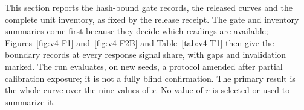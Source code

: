 
This section reports the hash-bound gate records, the released curves and the complete unit inventory, as fixed by the release receipt. The gate and inventory summaries come first because they decide which readings are available; Figures~\ref{fig:v4-F1} and~\ref{fig:v4-F2B} and Table~\ref{tab:v4-T1} then give the boundary records at every response signal share, with gaps and invalidation marked. %
The run evaluates, on new seeds, a protocol amended after partial calibration exposure; it is not a fully blind confirmation. %
The primary result is the whole curve over the nine values of $r$. No value of $r$ is selected or used to summarize it. %

